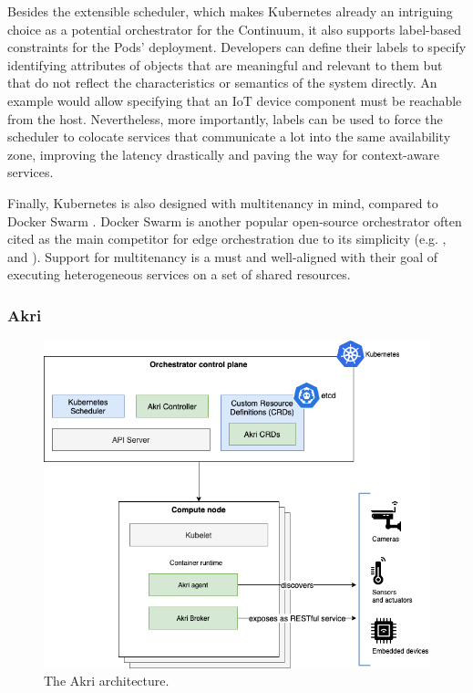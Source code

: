 Besides the extensible scheduler, which makes Kubernetes already an intriguing choice as a potential orchestrator for the Continuum, it also supports label-based constraints for the Pods' deployment. Developers can define their labels to specify identifying attributes of objects that are meaningful and relevant to them but that do not reflect the characteristics or semantics of the system directly. An example would allow specifying that an IoT device component must be reachable from the host. Nevertheless, more importantly, labels can be used to force the scheduler to colocate services that communicate a lot into the same availability zone, improving the latency drastically and paving the way for context-aware services. %

Finally, Kubernetes is also designed with multitenancy in mind, compared to Docker Swarm \cite{docker-swarm}. Docker Swarm is another popular open-source orchestrator often cited as the main competitor for edge orchestration due to its simplicity (e.g. \cite{bellavista2017feasibility}, and \cite{ismail2015evaluation}). Support for multitenancy is a must and well-aligned with their goal of executing heterogeneous services on a set of shared resources.

\subsubsection{Akri}
\label{sec:akri}

\begin{figure}[ht]
\centering
\includegraphics[width=\columnwidth]{figures/akri}
\caption{The Akri architecture.}
\label{fig:akri}
\end{figure}

